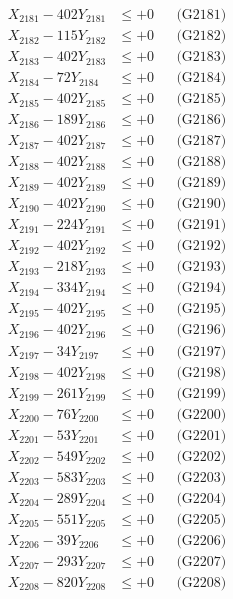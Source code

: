 \documentclass[a4paper,10pt]{article}
\begin{document}
{\begin{align}
\allowbreak
X_{2181} - 402Y_{2181} &\leq +0 && \text{(G2181)} \\
X_{2182} - 115Y_{2182} &\leq +0 && \text{(G2182)} \\
X_{2183} - 402Y_{2183} &\leq +0 && \text{(G2183)} \\
X_{2184} - 72Y_{2184} &\leq +0 && \text{(G2184)} \\
X_{2185} - 402Y_{2185} &\leq +0 && \text{(G2185)} \\
X_{2186} - 189Y_{2186} &\leq +0 && \text{(G2186)} \\
X_{2187} - 402Y_{2187} &\leq +0 && \text{(G2187)} \\
X_{2188} - 402Y_{2188} &\leq +0 && \text{(G2188)} \\
X_{2189} - 402Y_{2189} &\leq +0 && \text{(G2189)} \\
X_{2190} - 402Y_{2190} &\leq +0 && \text{(G2190)} \\
\allowbreak
X_{2191} - 224Y_{2191} &\leq +0 && \text{(G2191)} \\
X_{2192} - 402Y_{2192} &\leq +0 && \text{(G2192)} \\
X_{2193} - 218Y_{2193} &\leq +0 && \text{(G2193)} \\
X_{2194} - 334Y_{2194} &\leq +0 && \text{(G2194)} \\
X_{2195} - 402Y_{2195} &\leq +0 && \text{(G2195)} \\
X_{2196} - 402Y_{2196} &\leq +0 && \text{(G2196)} \\
X_{2197} - 34Y_{2197} &\leq +0 && \text{(G2197)} \\
X_{2198} - 402Y_{2198} &\leq +0 && \text{(G2198)} \\
X_{2199} - 261Y_{2199} &\leq +0 && \text{(G2199)} \\
X_{2200} - 76Y_{2200} &\leq +0 && \text{(G2200)} \\
\allowbreak
X_{2201} - 53Y_{2201} &\leq +0 && \text{(G2201)} \\
X_{2202} - 549Y_{2202} &\leq +0 && \text{(G2202)} \\
X_{2203} - 583Y_{2203} &\leq +0 && \text{(G2203)} \\
X_{2204} - 289Y_{2204} &\leq +0 && \text{(G2204)} \\
X_{2205} - 551Y_{2205} &\leq +0 && \text{(G2205)} \\
X_{2206} - 39Y_{2206} &\leq +0 && \text{(G2206)} \\
X_{2207} - 293Y_{2207} &\leq +0 && \text{(G2207)} \\
X_{2208} - 820Y_{2208} &\leq +0 && \text{(G2208)} \\

\end{align}}
\end{document}
